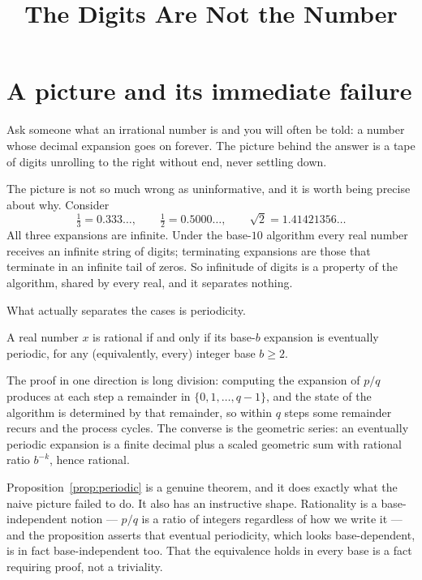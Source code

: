 \documentclass{essay}
\title{The Digits Are Not the Number}
\author{}
\date{}
\begin{document}
\maketitle

\section{A picture and its immediate failure}

Ask someone what an irrational number is and you will often be told: a number
whose decimal expansion goes on forever. The picture behind the answer is a
tape of digits unrolling to the right without end, never settling down.

The picture is not so much wrong as uninformative, and it is worth being
precise about why. Consider
\[
  \tfrac13 = 0.333\ldots, \qquad \tfrac12 = 0.5000\ldots, \qquad
  \sqrt2 = 1.41421356\ldots
\]
All three expansions are infinite. Under the base-$10$ algorithm every real
number receives an infinite string of digits; terminating expansions are those
that terminate in an infinite tail of zeros. So infinitude of digits is a
property of the algorithm, shared by every real, and it separates nothing.

What actually separates the cases is periodicity.

\begin{proposition}\label{prop:periodic}
A real number $x$ is rational if and only if its base-$b$ expansion is
eventually periodic, for any (equivalently, every) integer base $b \ge 2$.
\end{proposition}

The proof in one direction is long division: computing the expansion of $p/q$
produces at each step a remainder in $\{0,1,\ldots,q-1\}$, and the state of the
algorithm is determined by that remainder, so within $q$ steps some remainder
recurs and the process cycles. The converse is the geometric series: an
eventually periodic expansion is a finite decimal plus a scaled geometric sum
with rational ratio $b^{-k}$, hence rational.

Proposition~\ref{prop:periodic} is a genuine theorem, and it does exactly what
the naive picture failed to do. It also has an instructive shape. Rationality
is a base-independent notion --- $p/q$ is a ratio of integers regardless of how
we write it --- and the proposition asserts that eventual periodicity, which
looks base-dependent, is in fact base-independent too. That the equivalence
holds in every base is a fact requiring proof, not a triviality.
\end{document}

